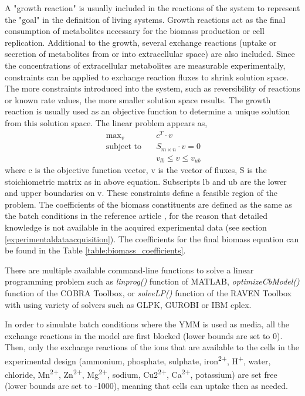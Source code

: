 A "growth reaction" is usually included in the reactions of the system to represent the "goal" in the definition of living systems. Growth reactions act as the final consumption of metabolites necessary for the biomass production or cell replication. Additional to the growth, several exchange reactions (uptake or secretion of metabolites from or into extracellular space) are also included. Since the concentrations of extracellular metabolites are measurable experimentally, constraints can be applied to exchange reaction fluxes to shrink solution space. The more constraints introduced into the system, such as reversibility of reactions or known rate values, the more smaller solution space results. The growth reaction is usually used as an objective function to determine a unique solution from this solution space. The linear problem appears as,
\begin{align}
 \ \text{max}_v \quad & c^T \cdot v \\
 \label{eq:fba}
 \ \text{subject to} \quad & S_{m \times n} \cdot v=0 \\
 \ & v_{lb} \leq v \leq v_{ub}
\end{align}
\noindent where c is the objective function vector, v is the vector of fluxes, S is the stoichiometric matrix as in above equation. Subscripts lb and ub are the lower and upper boundaries on v. These constraints define a feasible region of the problem. The coefficients of the biomass constituents are defined as the same as the batch conditions in the reference article \cite{nilsson2016metabolic}, for the reason that detailed knowledge is not available in the acquired experimental data (see section \ref{experimentaldataacquisition}). The coefficients for the final biomass equation can be found in the Table \ref{table:biomass_coefficients}.

\vspace{0.5cm}



There are multiple available command-line functions to solve a linear programming problem such as \emph{linprog()} function of MATLAB, \emph{optimizeCbModel()} function of the COBRA Toolbox, or \emph{solveLP()} function of the RAVEN Toolbox with using variety of solvers such as GLPK, GUROBI or IBM cplex.

In order to simulate batch conditions where the YMM is used as media, all the exchange reactions in the model are first blocked (lower bounds are set to 0). Then, only the exchange reactions of the ions that are available to the cells in the experimental design (ammonium, phosphate, sulphate, iron\textsuperscript{2+}, H\textsuperscript{+}, water, chloride, Mn\textsuperscript{2+}, Zn\textsuperscript{2+}, Mg\textsuperscript{2+}, sodium, Cu2\textsuperscript{2+}, Ca\textsuperscript{2+}, potassium) are set free (lower bounds are set to -1000), meaning that cells can uptake then as needed.


